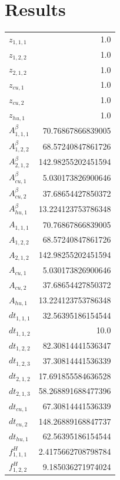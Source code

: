 \documentclass{article}%
\makeatletter
\let\mcnewpage=\newpage%
\newcommand{\TrickSupertabularIntoMulticols}{%
\renewcommand\newpage{%
\if@firstcolumn%
\hrule width\linewidth height0pt%
\columnbreak%
\else%
\mcnewpage%
\fi%
}%
}%
\makeatother
\begin{document}
\section{Results}%
\thispagestyle{plain}%
\begin{multicols*}{3}%
\TrickSupertabularIntoMulticols%
%
\begin{supertabular}{lr}%
	$z_{1,1,1}$ & 1.0 \\%
	$z_{1,2,2}$ & 1.0 \\%
	$z_{2,1,2}$ & 1.0 \\%
	$z_{cu,1}$ & 1.0 \\%
	$z_{cu,2}$ & 1.0 \\%
	$z_{hu,1}$ & 1.0 \\%
	$A_{1,1,1}^{\beta}$ & 70.76867866839005 \\%
	$A_{1,2,2}^{\beta}$ & 68.57240847861726 \\%
	$A_{2,1,2}^{\beta}$ & 142.98255202451594 \\%
	$A_{cu,1}^{\beta}$ & 5.030173826900646 \\%
	$A_{cu,2}^{\beta}$ & 37.68654427850372 \\%
	$A_{hu,1}^{\beta}$ & 13.224123753786348 \\%
	$A_{1,1,1}$ & 70.76867866839005 \\%
	$A_{1,2,2}$ & 68.57240847861726 \\%
	$A_{2,1,2}$ & 142.98255202451594 \\%
	$A_{cu,1}$ & 5.030173826900646 \\%
	$A_{cu,2}$ & 37.68654427850372 \\%
	$A_{hu,1}$ & 13.224123753786348 \\%
	$dt_{1,1,1}$ & 32.56395186154544 \\%
	$dt_{1,1,2}$ & 10.0 \\%
	$dt_{1,2,2}$ & 82.30814441536347 \\%
	$dt_{1,2,3}$ & 37.30814441536339 \\%
	$dt_{2,1,2}$ & 17.691855584636528 \\%
	$dt_{2,1,3}$ & 58.268891688477396 \\%
	$dt_{cu,1}$ & 67.30814441536339 \\%
	$dt_{cu,2}$ & 148.26889168847737 \\%
	$dt_{hu,1}$ & 62.56395186154544 \\%
	$f_{1,1,1}^{H}$ & 2.4175662708798784 \\%
	$f_{1,2,2}^{H}$ & 9.185036271974024 \\%

\end{supertabular}
\end{multicols*}
\end{document}
